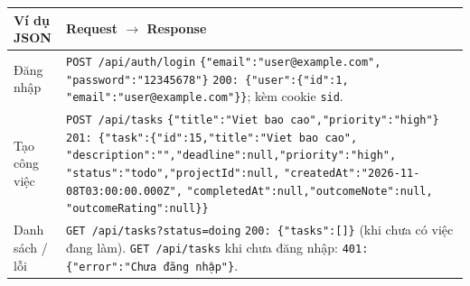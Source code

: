 \begin{longtable}{@{}P{.21\linewidth}P{.70\linewidth}@{}}
\toprule
\textbf{Ví dụ JSON} & \textbf{Request $\rightarrow$ Response} \\
\midrule
\endhead
Đăng nhập & \texttt{POST /api/auth/login}\newline
\texttt{\{"email":"user@example.com",}\newline
\texttt{"password":"12345678"\}}\newline
\texttt{200: \{"user":\{"id":1,}\newline
\texttt{"email":"user@example.com"\}\}}; kèm cookie \texttt{sid}. \\
Tạo công việc & \texttt{POST /api/tasks}\newline
\texttt{\{"title":"Viet bao cao","priority":"high"\}}\newline
\texttt{201: \{"task":\{"id":15,"title":"Viet bao cao",}\newline
\texttt{"description":"","deadline":null,"priority":"high",}\newline
\texttt{"status":"todo","projectId":null,}\newline
\texttt{"createdAt":"2026-11-08T03:00:00.000Z",}\newline
\texttt{"completedAt":null,"outcomeNote":null,}\newline
\texttt{"outcomeRating":null\}\}} \\
Danh sách / lỗi & \texttt{GET /api/tasks?status=doing}\newline
\texttt{200: \{"tasks":[]\}} (khi chưa có việc đang làm).\newline
\texttt{GET /api/tasks} khi chưa đăng nhập:\newline
\texttt{401: \{"error":"Chưa đăng nhập"\}}. \\
\bottomrule
\end{longtable}


